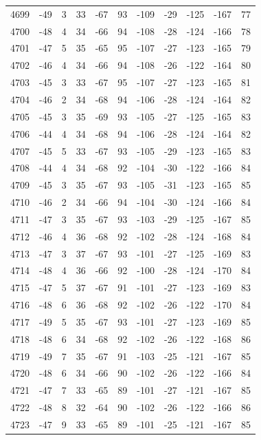 \begin{table}[H]
\begin{tabular}{lllllllllll}
4699 & -49 & 3 & 33 & -67 & 93 & -109 & -29 & -125 & -167 & 77 \\
4700 & -48 & 4 & 34 & -66 & 94 & -108 & -28 & -124 & -166 & 78 \\
4701 & -47 & 5 & 35 & -65 & 95 & -107 & -27 & -123 & -165 & 79 \\
4702 & -46 & 4 & 34 & -66 & 94 & -108 & -26 & -122 & -164 & 80 \\
4703 & -45 & 3 & 33 & -67 & 95 & -107 & -27 & -123 & -165 & 81 \\
4704 & -46 & 2 & 34 & -68 & 94 & -106 & -28 & -124 & -164 & 82 \\
4705 & -45 & 3 & 35 & -69 & 93 & -105 & -27 & -125 & -165 & 83 \\
4706 & -44 & 4 & 34 & -68 & 94 & -106 & -28 & -124 & -164 & 82 \\
4707 & -45 & 5 & 33 & -67 & 93 & -105 & -29 & -123 & -165 & 83 \\
4708 & -44 & 4 & 34 & -68 & 92 & -104 & -30 & -122 & -166 & 84 \\
4709 & -45 & 3 & 35 & -67 & 93 & -105 & -31 & -123 & -165 & 85 \\
4710 & -46 & 2 & 34 & -66 & 94 & -104 & -30 & -124 & -166 & 84 \\
4711 & -47 & 3 & 35 & -67 & 93 & -103 & -29 & -125 & -167 & 85 \\
4712 & -46 & 4 & 36 & -68 & 92 & -102 & -28 & -124 & -168 & 84 \\
4713 & -47 & 3 & 37 & -67 & 93 & -101 & -27 & -125 & -169 & 83 \\
4714 & -48 & 4 & 36 & -66 & 92 & -100 & -28 & -124 & -170 & 84 \\
4715 & -47 & 5 & 37 & -67 & 91 & -101 & -27 & -123 & -169 & 83 \\
4716 & -48 & 6 & 36 & -68 & 92 & -102 & -26 & -122 & -170 & 84 \\
4717 & -49 & 5 & 35 & -67 & 93 & -101 & -27 & -123 & -169 & 85 \\
4718 & -48 & 6 & 34 & -68 & 92 & -102 & -26 & -122 & -168 & 86 \\
4719 & -49 & 7 & 35 & -67 & 91 & -103 & -25 & -121 & -167 & 85 \\
4720 & -48 & 6 & 34 & -66 & 90 & -102 & -26 & -122 & -166 & 84 \\
4721 & -47 & 7 & 33 & -65 & 89 & -101 & -27 & -121 & -167 & 85 \\
4722 & -48 & 8 & 32 & -64 & 90 & -102 & -26 & -122 & -166 & 86 \\
4723 & -47 & 9 & 33 & -65 & 89 & -101 & -25 & -121 & -167 & 85 \\

\end{tabular}
\end{table}
